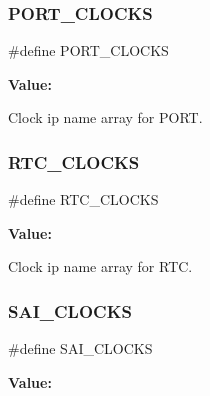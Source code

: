 \subsubsection{\texorpdfstring{PORT\_CLOCKS}{PORT\_CLOCKS}}
{\footnotesize\ttfamily \#define P\+O\+R\+T\+\_\+\+C\+L\+O\+C\+KS}

{\bfseries Value\+:}
\begin{DoxyCode}{0}
\DoxyCodeLine{\{                                                                        \(\backslash\)}
\DoxyCodeLine{    \}}

\end{DoxyCode}


Clock ip name array for P\+O\+RT. 

\mbox{\label{group__clock_ga426bb38a06d4765b5a11c5513a583481}} 
\subsubsection{\texorpdfstring{RTC\_CLOCKS}{RTC\_CLOCKS}}
{\footnotesize\ttfamily \#define R\+T\+C\+\_\+\+C\+L\+O\+C\+KS}

{\bfseries Value\+:}
\begin{DoxyCode}{0}
\DoxyCodeLine{\{               \(\backslash\)}
\DoxyCodeLine{    \}}

\end{DoxyCode}


Clock ip name array for R\+TC. 

\mbox{\label{group__clock_gab3f24de813a146fd05809f0c969b1b16}} 
\subsubsection{\texorpdfstring{SAI\_CLOCKS}{SAI\_CLOCKS}}
{\footnotesize\ttfamily \#define S\+A\+I\+\_\+\+C\+L\+O\+C\+KS}

{\bfseries Value\+:}
\begin{DoxyCode}{0}
\DoxyCodeLine{\{               \(\backslash\)}
\DoxyCodeLine{    \}}

\end{DoxyCode}


